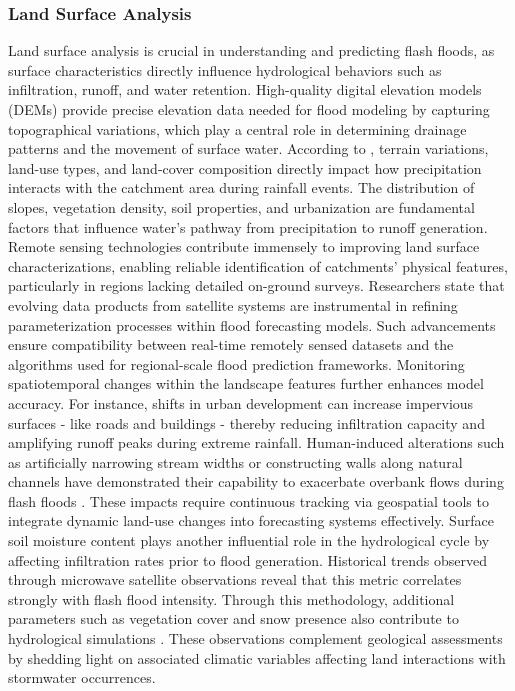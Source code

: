 \subsubsection{Land Surface Analysis}
Land surface analysis is crucial in understanding and predicting flash floods, as surface characteristics directly influence hydrological behaviors such as infiltration, runoff, and water retention. High-quality digital elevation models (DEMs) provide precise elevation data needed for flood modeling by capturing topographical variations, which play a central role in determining drainage patterns and the movement of surface water. According to \citep{Nguyen2020}, terrain variations, land-use types, and land-cover composition directly impact how precipitation interacts with the catchment area during rainfall events. The distribution of slopes, vegetation density, soil properties, and urbanization are fundamental factors that influence water's pathway from precipitation to runoff generation.
Remote sensing technologies contribute immensely to improving land surface characterizations, enabling reliable identification of catchments' physical features, particularly in regions lacking detailed on-ground surveys. Researchers \citep{Georgakakos2022} state that evolving data products from satellite systems are instrumental in refining parameterization processes within flood forecasting models. Such advancements ensure compatibility between real-time remotely sensed datasets and the algorithms used for regional-scale flood prediction frameworks.
Monitoring spatiotemporal changes within the landscape features further enhances model accuracy. For instance, shifts in urban development can increase impervious surfaces - like roads and buildings - thereby reducing infiltration capacity and amplifying runoff peaks during extreme rainfall. Human-induced alterations such as artificially narrowing stream widths or constructing walls along natural channels have demonstrated their capability to exacerbate overbank flows during flash floods \citep{Kastridis2020}. These impacts require continuous tracking via geospatial tools to integrate dynamic land-use changes into forecasting systems effectively.
Surface soil moisture content plays another influential role in the hydrological cycle by affecting infiltration rates prior to flood generation. Historical trends observed through microwave satellite observations reveal that this metric correlates strongly with flash flood intensity. Through this methodology, additional parameters such as vegetation cover and snow presence also contribute to hydrological simulations \citep{Msigwa2024}. These observations complement geological assessments by shedding light on associated climatic variables affecting land interactions with stormwater occurrences.
